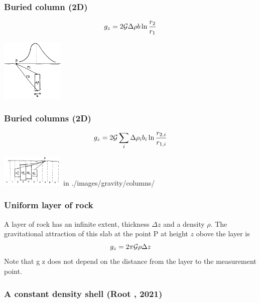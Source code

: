 \subsubsection{Buried column (2D)}

\[
g_z=2 {\cal G} \Delta \rho b \ln \frac{r_2}{r_1}
\]

\begin{center}
\includegraphics[width=3cm]{images/gravity/column}
\end{center}

\subsubsection{Buried columns (2D)}

\[
g_z=2 {\cal G} \sum_i  \Delta \rho_i  b_i  \ln \frac{r_{2,i}}{r_{1,i}}
\]

\begin{center}
\includegraphics[width=3cm]{images/gravity/columns}
{\tiny {\color{gray} in ./images/gravity/columns/}}
\end{center}





\subsubsection{Uniform layer of rock}

A layer of rock has an infinite extent, thickness $\Delta z$ 
and a density $\rho$. The gravitational
attraction of this slab at the point P at height $z$ obove the layer is 
\[
g_z=2 \pi {\cal G} \rho \Delta z
\]
Note that g z does not depend on the distance from the layer to the measurement point.



\newpage
\subsubsection{A constant density shell (Root \etal, 2021)}

